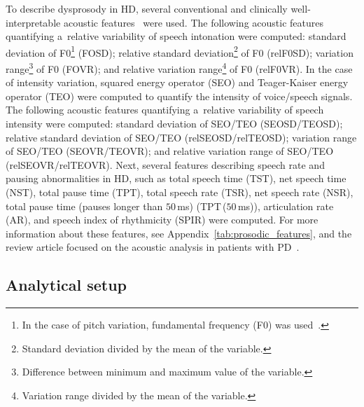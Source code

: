 To describe dysprosody in HD, several conventional and clinically well-interpretable acoustic features~\cite{Brabenec2017} were used. The following acoustic features quantifying a~relative variability of speech intonation were computed: standard deviation of F0\footnote{In the case of pitch variation, fundamental frequency (F0) was used~\cite{Boersma2012}.} (FOSD); relative standard deviation\footnote{Standard deviation divided by the mean of the variable.} of F0 (relF0SD); variation range\footnote{Difference between minimum and maximum value of the variable.} of F0 (FOVR); and relative variation range\footnote{Variation range divided by the mean of the variable.} of F0 (relF0VR). In the case of intensity variation, squared energy operator (SEO) and Teager-Kaiser energy operator (TEO) were computed to quantify the intensity of voice/speech signals. The following acoustic features quantifying a~relative variability of speech intensity were computed: standard deviation of SEO/TEO (SEOSD/TEOSD); relative standard deviation of SEO/TEO (relSEOSD/relTEOSD); variation range of SEO/TEO (SEOVR/TEOVR); and relative variation range of SEO/TEO (relSEOVR/relTEOVR). Next, several features describing speech rate and pausing abnormalities in HD, such as total speech time (TST), net speech time (NST), total pause time (TPT), total speech rate (TSR), net speech rate (NSR), total pause time (pauses longer than $50$\,ms) (TPT\,($50$\,ms)), articulation rate (AR), and speech index of rhythmicity (SPIR) were computed. For more information about these features, see Appendix~\ref{tab:prosodic_features}, and the review article focused on the acoustic analysis in patients with PD~\cite{Brabenec2017}.

\subsection{Analytical setup}
\label{ch4_3_3}


